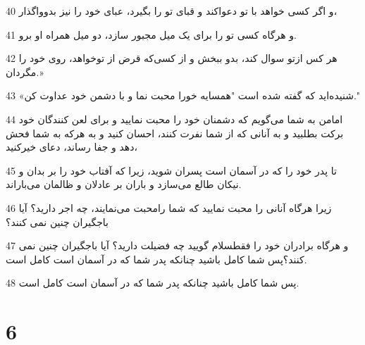 \par 40 و اگر کسی خواهد با تو دعواکند و قبای تو را بگیرد، عبای خود را نیز بدوواگذار،
\par 41 و هرگاه کسی تو را برای یک میل مجبور سازد، دو میل همراه او برو.
\par 42 هر کس ازتو سوال کند، بدو ببخش و از کسی‌که قرض از توخواهد، روی خود را مگردان.»
\par 43 «شنیده‌اید که گفته شده است "همسایه خورا محبت نما و با دشمن خود عداوت کن."
\par 44 امامن به شما می‌گویم که دشمنان خود را محبت نمایید و برای لعن کنندگان خود برکت بطلبید و به آنانی که از شما نفرت کنند، احسان کنید و به هرکه به شما فحش دهد و جفا رساند، دعای خیرکنید،
\par 45 تا پدر خود را که در آسمان است پسران شوید، زیرا که آفتاب خود را بر بدان و نیکان طالع می‌سازد و باران بر عادلان و ظالمان می‌باراند.
\par 46 زیرا هرگاه آنانی را محبت نمایید که شما رامحبت می‌نمایند، چه اجر دارید؟ آیا باجگیران چنین نمی کنند؟
\par 47 و هرگاه برادران خود را فقطسلام گویید چه فضیلت دارید؟ آیا باجگیران چنین نمی کنند؟پس شما کامل باشید چنانکه پدر شما که در آسمان است کامل است.
\par 48 پس شما کامل باشید چنانکه پدر شما که در آسمان است کامل است.

\chapter{6}


